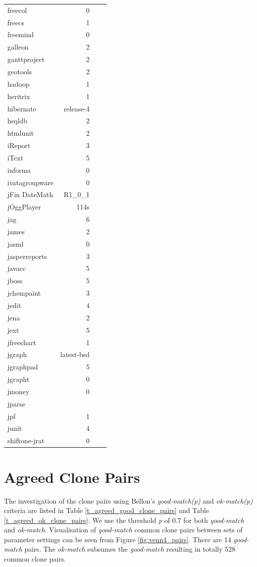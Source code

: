 \documentclass{IEEEtran}
\begin{document}
\begin{table}[h]
\begin{tabular}{l|r|r|l}
	freecol & 0 & \\
	freecs & 1 & \\
	freemind & 0 & \\
	galleon & 2 & \\
	ganttproject & 2 & \\
	geotools & 2 & \\
	hadoop & 1 & \\
	heritrix & 1 & \\
	hibernate & release-4 & \\
	hsqldb & 2 & \\
	htmlunit & 2 & \\
	iReport & 3 & \\
	iText & 5 & \\
	informa & 0 & \\
	ivatagroupware & 0 & \\
	jFin DateMath & R1\_0\_1 & \\
	jOggPlayer & 114s & \\
	jag & 6 & \\
	james & 2 & \\
	jasml & 0 & \\
	jasperreports & 3 & \\
	javacc & 5 & \\
	jboss & 5 & \\
	jchempaint & 3 & \\
	jedit & 4 & \\
	jena & 2 & \\
	jext & 5 & \\
	jfreechart & 1 & \\
	jgraph & latest-bsd & \\
	jgraphpad & 5 & \\
	jgrapht & 0 & \\
	jmoney & 0 & \\
	jparse & & \\
	jpf & 1 & \\
	junit & 4 & \\
	shiftone-jrat & 0 & \\
	\hline 
\end{tabular} 
\end{table}

\section*{Agreed Clone Pairs}
The investigation of the clone pairs using Bellon's \textit{good-match(p)} and \textit{ok-match(p)} criteria are listed in  Table \ref{t_agreed_good_clone_pairs} and Table \ref{t_agreed_ok_clone_pairs}. We use the threshold \textit{p} of 0.7 for both \textit{good-match} and \textit{ok-match}. Visualisation of \textit{good-match} common clone pairs between sets of parameter settings can be seen from Figure \ref{fig:venn4_pairs}. There are 14 \textit{good-match} pairs. The \textit{ok-match} subsumes the \textit{good-match} resulting in totally 528 common clone pairs.
\end{document}
